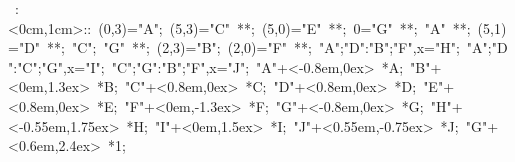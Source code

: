 
%

\hbox{
   \xy    <1cm,0cm>:<0cm,1cm>::
       (0,3)="A"; (5,3)="C" **\dir{-}; (5,0)="E" **\dir{-}; 
       0="G"  **\dir{-}; "A" **\dir{-}; (5,1)="D" **\dir{-}; 
       "C"; "G" **\dir{-}; (2,3)="B"; (2,0)="F" **\dir{-};
       {"A";"D":"B";"F",x}="H";  {"A";"D":"C";"G",x}="I";
       {"C";"G":"B";"F",x}="J"; 
       "A"+<-0.8em,0ex> *{A}; "B"+<0em,1.3ex> *{B};  
       "C"+<0.8em,0ex> *{C};  "D"+<0.8em,0ex> *{D};    
       "E"+<0.8em,0ex> *{E}; "F"+<0em,-1.3ex> *{F};  
       "G"+<-0.8em,0ex> *{G};  "H"+<-0.55em,1.75ex> *{H};    
       "I"+<0em,1.5ex> *{I};  "J"+<0.55em,-0.75ex> *{J};   
       "G"+<0.6em,2.4ex> *{1}; 
   \endxy}
